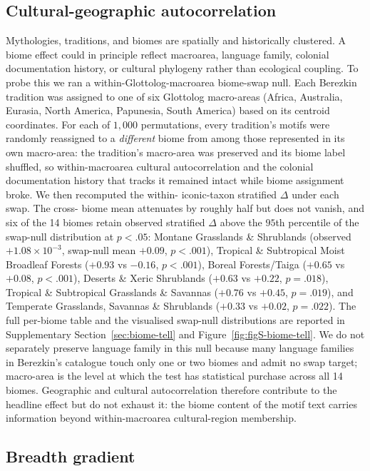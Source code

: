 \documentclass[11pt,a4paper]{article}
\begin{document}
\subsection*{Cultural-geographic autocorrelation}

Mythologies, traditions, and biomes are spatially and
historically clustered. A biome effect could in principle
reflect macroarea, language family, colonial documentation
history, or cultural phylogeny rather than ecological coupling.
To probe this we ran a within-Glottolog-macroarea biome-swap
null. Each Berezkin tradition was assigned to one of six
Glottolog macro-areas (Africa, Australia, Eurasia, North
America, Papunesia, South America) based on its centroid
coordinates. For each of $1{,}000$ permutations, every
tradition's motifs were randomly reassigned to a \emph{different}
biome from among those represented in its own macro-area: the
tradition's macro-area was preserved and its biome label
shuffled, so within-macroarea cultural autocorrelation and the
colonial documentation history that tracks it remained intact
while biome assignment broke. We then recomputed the within-
iconic-taxon stratified $\Delta$ under each swap. The cross-
biome mean attenuates by roughly half but does not vanish, and
six of the 14 biomes retain observed stratified $\Delta$ above
the $95$th percentile of the swap-null distribution at $p<.05$:
Montane Grasslands \& Shrublands (observed $+1.08\times 10^{-3}$,
swap-null mean $+0.09$, $p<.001$), Tropical \& Subtropical Moist
Broadleaf Forests ($+0.93$ vs $-0.16$, $p<.001$), Boreal
Forests/Taiga ($+0.65$ vs $+0.08$, $p<.001$), Deserts \& Xeric
Shrublands ($+0.63$ vs $+0.22$, $p=.018$), Tropical \&
Subtropical Grasslands \& Savannas ($+0.76$ vs $+0.45$,
$p=.019$), and Temperate Grasslands, Savannas \& Shrublands
($+0.33$ vs $+0.02$, $p=.022$). The full per-biome table and
the visualised swap-null distributions are reported in
Supplementary Section~\ref{sec:biome-tell} and
Figure~\ref{fig:figS-biome-tell}. We do not separately preserve
language family in this null because many language families in
Berezkin's catalogue touch only one or two biomes and admit no
swap target; macro-area is the level at which the test has
statistical purchase across all 14 biomes. Geographic and
cultural autocorrelation therefore contribute to the headline
effect but do not exhaust it: the biome content of the motif
text carries information beyond within-macroarea cultural-region
membership.

\subsection*{Breadth gradient}
\end{document}
